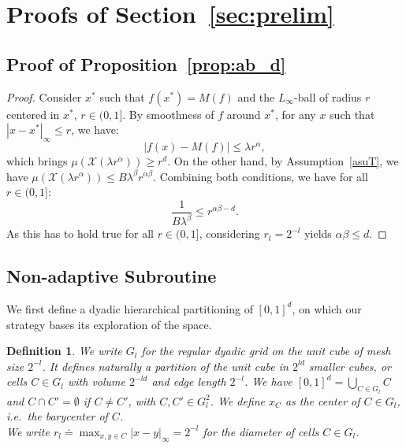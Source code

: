 \documentclass[final,12pt]{colt2018}
\newtheorem{defi}{Definition}
\begin{document}





\appendix
\section{Proofs of Section~\ref{sec:prelim}}
\subsection{Proof of Proposition~\ref{prop:ab_d}}\label{proof:ab_d}
\begin{proof}
Consider $x^*$ such that $f(x^*) = M(f)$ and the $L_{\infty}$-ball of radius $r$ centered in $x^*$, $r \in (0,1]$. By smoothness of $f$ around $x^*$, for any $x$ such that $|x-x^*|_{\infty} \leq r$, we have:
$$|f(x) - M(f)| \leq \lambda r^{\alpha},$$
which brings $\mu(\mathcal X(\lambda r^\alpha)) \geq r^d$. On the other hand, by Assumption~\ref{asuT}, we have $\mu(\mathcal X(\lambda r^\alpha)) \leq B\lambda^\beta r^{\alpha\beta}$. Combining both conditions, we have for all $r \in (0, 1]$:
$$
\frac{1}{B\lambda^{\beta}} \leq r^{\alpha\beta - d}.
$$
As this has to hold true for all $r \in (0, 1]$, considering $r_l=2^{-l}$ yields $\alpha\beta \leq d$.

\end{proof}
\subsection{Non-adaptive Subroutine}\label{sec:sr}
We first define a dyadic hierarchical partitioning of $[0,1]^d$, on which our strategy bases its exploration of the space. 
\begin{defi}\label{def:grid}
We write $G_l$ for the regular dyadic grid on the unit cube of mesh size $2^{-l}$. It defines naturally a partition of the unit cube in $2^{ld}$ smaller cubes, or cells $C\in G_l$ with volume $2^{-ld}$ and edge length $2^{-l}$. We have $[0,1]^d = \bigcup_{C\in G_l} C$ and $C\cap C' = \emptyset$ if $C\neq C'$, with $C,C' \in G_l^2$. We define $x_C$ as the center of $C\in G_l$, i.e.~the barycenter of $C$.\\
We write $r_l \doteq \max_{x,y \in C} |x-y|_{\infty} = 2^{-l}$ for the diameter of cells $C \in G_l$.

\end{defi}
\end{document}
